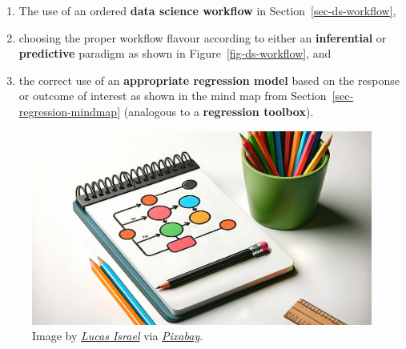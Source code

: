 \documentclass[
  letterpaper,
  DIV=11,
  numbers=noendperiod]{scrreprt}
\providecommand{\tightlist}{%
  \setlength{\itemsep}{0pt}\setlength{\parskip}{0pt}}\usepackage{longtable,booktabs,array}
\begin{document}
\begin{enumerate}
\def\labelenumi{\arabic{enumi}.}
\tightlist
\item
  The use of an ordered \textbf{data science workflow} in
  Section~\ref{sec-ds-workflow},
\item
  choosing the proper workflow flavour according to either an
  \textbf{inferential} or \textbf{predictive} paradigm as shown in
  Figure~\ref{fig-ds-workflow}, and
\item
  the correct use of an \textbf{appropriate regression model} based on
  the response or outcome of interest as shown in the mind map from
  Section~\ref{sec-regression-mindmap} (analogous to a
  \textbf{regression toolbox}).
\end{enumerate}

\begin{figure}[H]

{\centering \includegraphics[width=5.20833in,height=\textheight]{book/img/flowchart.png}

}

\caption{Image by
\href{https://pixabay.com/users/lucasjisrael-43158173/}{\emph{Lucas
Israel}} via
\href{https://pixabay.com/illustrations/flowchart-diagram-sketch-notepad-8860311/}{\emph{Pixabay}}.}

\end{figure}%
\end{document}
